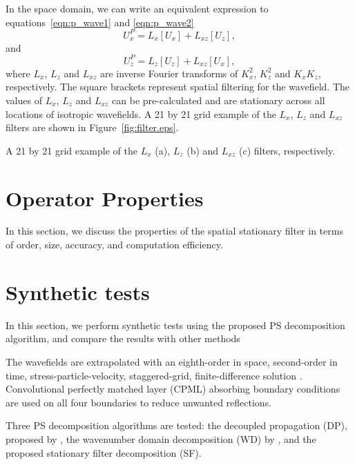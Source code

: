 \documentclass[manuscript,ulem,graphix,revised]{geophysics}
\begin{document}
In the space domain, we can write an equivalent expression to equations~\ref{eqn:p_wave1} and \ref{eqn:p_wave2}
\begin{equation}
U^P_x = L_x [U_x] + L_{xz} [U_z],
\label{eqn:p_space1}
\end{equation}
and 
\begin{equation}
U^P_z = L_z [U_z] + L_{xz} [U_x],
\label{eqn:p_space2}
\end{equation}
where $L_x$, $L_z$ and $L_{xz}$ are inverse Fourier transforms of $K^2_x$, $K^2_z$ and $K_xK_z$, respectively. The square brackets represent spatial filtering for the wavefield. The values of $L_x$, $L_z$ and $L_{xz}$ can  be pre-calculated and are stationary across all locations of isotropic wavefields. A 21 by 21 grid example of the $L_x$, $L_z$ and $L_{xz}$ filters are shown in Figure~\ref{fig:filter.eps}.

{
A 21 by 21 grid example of the $L_x$ (a), $L_z$ (b) and $L_{xz}$ (c) filters, respectively.
}

\section{Operator Properties}
\indent\indent
In this section, we discuss the properties of the spatial stationary filter in terms of order, size, accuracy, and computation efficiency. 

\section{Synthetic tests}
\indent\indent
In this section, we perform synthetic tests using the proposed PS decomposition algorithm, and compare the results with other methods

The wavefields are extrapolated with an eighth-order in space, second-order in time, stress-particle-velocity, staggered-grid, finite-difference solution \citep{virieux86}. Convolutional perfectly matched layer (CPML) absorbing boundary conditions \citep{komatitsch07} are used on all four boundaries to reduce unwanted reflections.

Three PS decomposition algorithms are tested: the decoupled propagation (DP), proposed by \citet{ma03}, the wavenumber domain decomposition (WD) by \citet{zhang10}, and the proposed stationary filter decomposition (SF). 
\end{document}
